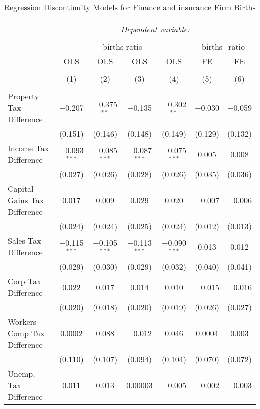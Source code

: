 
\begin{table}[!htbp] \centering 
  \caption{Regression Discontinuity Models for  Finance and insurance Firm Births} 
  \label{52rd} 
\begin{tabular}{@{\extracolsep{5pt}}lcccccc} 
\\[-1.8ex]\hline 
\hline \\[-1.8ex] 
 & \multicolumn{6}{c}{\textit{Dependent variable:}} \\ 
\cline{2-7} 
\\[-1.8ex] & \multicolumn{4}{c}{births ratio} & \multicolumn{2}{c}{births\_ratio} \\ 
 & OLS & OLS & OLS & OLS & FE & FE \\ 
\\[-1.8ex] & (1) & (2) & (3) & (4) & (5) & (6)\\ 
\hline \\[-1.8ex] 
 Property Tax Difference & $-$0.207 & $-$0.375$^{**}$ & $-$0.135 & $-$0.302$^{**}$ & $-$0.030 & $-$0.059 \\ 
  & (0.151) & (0.146) & (0.148) & (0.149) & (0.129) & (0.132) \\ 
  Income Tax Difference & $-$0.093$^{***}$ & $-$0.085$^{***}$ & $-$0.087$^{***}$ & $-$0.075$^{***}$ & 0.005 & 0.008 \\ 
  & (0.027) & (0.026) & (0.028) & (0.026) & (0.035) & (0.036) \\ 
  Capital Gains Tax Difference & 0.017 & 0.009 & 0.029 & 0.020 & $-$0.007 & $-$0.006 \\ 
  & (0.024) & (0.024) & (0.025) & (0.024) & (0.012) & (0.013) \\ 
  Sales Tax Difference & $-$0.115$^{***}$ & $-$0.105$^{***}$ & $-$0.113$^{***}$ & $-$0.090$^{***}$ & 0.013 & 0.012 \\ 
  & (0.029) & (0.030) & (0.029) & (0.032) & (0.040) & (0.041) \\ 
  Corp Tax Difference & 0.022 & 0.017 & 0.014 & 0.010 & $-$0.015 & $-$0.016 \\ 
  & (0.020) & (0.018) & (0.020) & (0.019) & (0.026) & (0.027) \\ 
  Workers Comp Tax Difference & 0.0002 & 0.088 & $-$0.012 & 0.046 & 0.0004 & 0.003 \\ 
  & (0.110) & (0.107) & (0.094) & (0.104) & (0.070) & (0.072) \\ 
  Unemp. Tax Difference & 0.011 & 0.013 & 0.00003 & $-$0.005 & $-$0.002 & $-$0.003 \\ 

\end{tabular}
\end{table}
